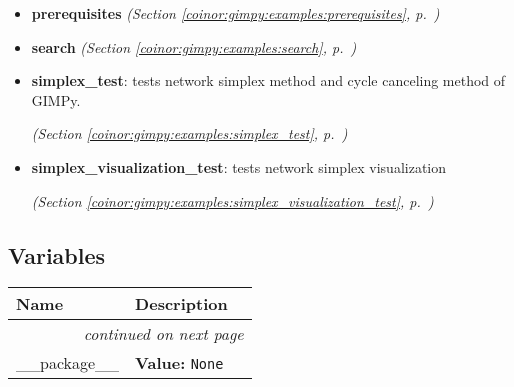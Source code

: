 \begin{itemize}
\item \textbf{prerequisites}
  \textit{(Section \ref{coinor:gimpy:examples:prerequisites}, p.~\pageref{coinor:gimpy:examples:prerequisites})}

\item \textbf{search}
  \textit{(Section \ref{coinor:gimpy:examples:search}, p.~\pageref{coinor:gimpy:examples:search})}

\item \textbf{simplex\_test}: tests network simplex method and cycle canceling method of GIMPy.



  \textit{(Section \ref{coinor:gimpy:examples:simplex_test}, p.~\pageref{coinor:gimpy:examples:simplex_test})}

\item \textbf{simplex\_visualization\_test}: tests network simplex visualization



  \textit{(Section \ref{coinor:gimpy:examples:simplex_visualization_test}, p.~\pageref{coinor:gimpy:examples:simplex_visualization_test})}

\end{itemize}



  \subsection{Variables}

    \vspace{-1cm}
\hspace{\varindent}\begin{longtable}{|p{\varnamewidth}|p{\vardescrwidth}|l}
\cline{1-2}
\cline{1-2} \centering \textbf{Name} & \centering \textbf{Description}& \\
\cline{1-2}
\endhead\cline{1-2}\multicolumn{3}{r}{\small\textit{continued on next page}}\\\endfoot\cline{1-2}
\endlastfoot\raggedright \_\-\_\-p\-a\-c\-k\-a\-g\-e\-\_\-\_\- & \raggedright \textbf{Value:} 
{\tt None}&\\
\cline{1-2}
\end{longtable}

